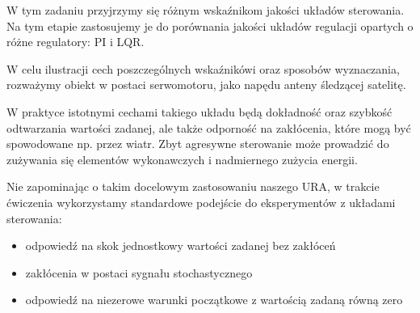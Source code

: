 \documentclass{sprawozdanie-agh}
\begin{document}
W tym zadaniu przyjrzymy się różnym wskaźnikom jakości układów sterowania. 
Na tym etapie zastosujemy je do porównania jakości układów regulacji opartych o różne regulatory: PI i LQR.  

W celu ilustracji cech poszczególnych wskaźnikówi oraz sposobów wyznaczania, rozważymy obiekt w postaci serwomotoru, jako napędu
anteny śledzącej satelitę. 

W praktyce istotnymi cechami takiego układu będą dokładność oraz szybkość odtwarzania wartości zadanej, ale także odporność na zakłócenia, które mogą być spowodowane np. przez wiatr.
Zbyt agresywne sterowanie może prowadzić do zużywania się elementów wykonawczych i nadmiernego zużycia energii.

Nie zapominając o takim docelowym zastosowaniu naszego URA, w trakcie ćwiczenia wykorzystamy standardowe podejście do eksperymentów z układami sterowania:
\begin{itemize}
\item odpowiedź na skok jednostkowy wartości zadanej bez zakłóceń
\item zakłócenia w postaci sygnału stochastycznego
\item odpowiedź na niezerowe warunki początkowe z wartością zadaną równą zero
\end{itemize}
\end{document}
